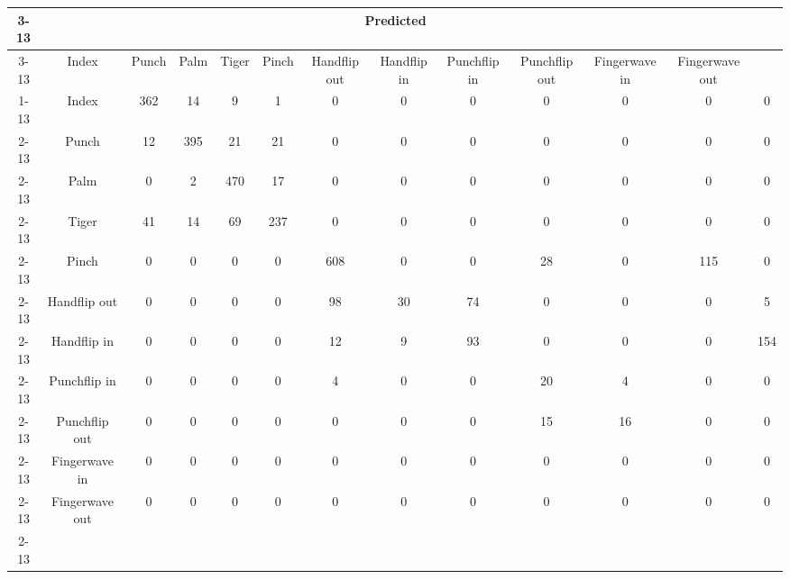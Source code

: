 \documentclass{standalone}
\begin{document}
 
 \begin{tabular}{|c |c |c |c |c |c |c |c |c |c |c |c |c |}
\cline{3-13}\multicolumn{2}{c|}{} & \multicolumn{11}{c|}{Predicted} \\ 
\cline{3-13} \multicolumn{2}{c |}{ } & Index & Punch & Palm & Tiger & Pinch & Handflip out & Handflip in & Punchflip in & Punchflip out & Fingerwave in & Fingerwave out\\ 
\cline{1-13}\multirow{11}{*}{\rotatebox[origin=c]{90}{Actual}} & Index & 362 & 14 & 9 & 1 & 0 & 0 & 0 & 0 & 0 & 0 & 0\\ 
 \cline{2-13} & Punch & 12 & 395 & 21 & 21 & 0 & 0 & 0 & 0 & 0 & 0 & 0\\ 
 \cline{2-13} & Palm & 0 & 2 & 470 & 17 & 0 & 0 & 0 & 0 & 0 & 0 & 0\\ 
 \cline{2-13} & Tiger & 41 & 14 & 69 & 237 & 0 & 0 & 0 & 0 & 0 & 0 & 0\\ 
 \cline{2-13} & Pinch & 0 & 0 & 0 & 0 & 608 & 0 & 0 & 28 & 0 & 115 & 0\\ 
 \cline{2-13} & Handflip out & 0 & 0 & 0 & 0 & 98 & 30 & 74 & 0 & 0 & 0 & 5\\ 
 \cline{2-13} & Handflip in & 0 & 0 & 0 & 0 & 12 & 9 & 93 & 0 & 0 & 0 & 154\\ 
 \cline{2-13} & Punchflip in & 0 & 0 & 0 & 0 & 4 & 0 & 0 & 20 & 4 & 0 & 0\\ 
 \cline{2-13} & Punchflip out & 0 & 0 & 0 & 0 & 0 & 0 & 0 & 15 & 16 & 0 & 0\\ 
 \cline{2-13} & Fingerwave in & 0 & 0 & 0 & 0 & 0 & 0 & 0 & 0 & 0 & 0 & 0\\ 
 \cline{2-13} & Fingerwave out & 0 & 0 & 0 & 0 & 0 & 0 & 0 & 0 & 0 & 0 & 0\\ 
 \cline{2-13}\hline \end{tabular}
 
\end{document}
